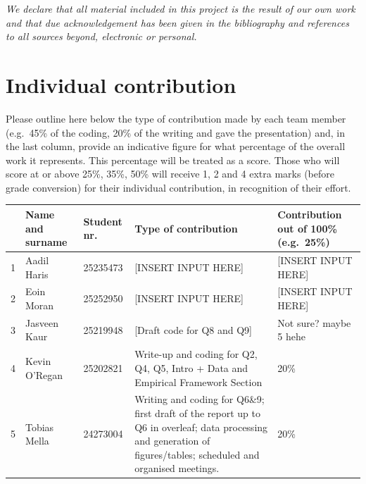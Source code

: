 \documentclass[11pt]{exam}
\begin{document}


\clearpage
\thispagestyle{plain}

\noindent
\textit{We declare that all material included in this project is the result of our own work and that due acknowledgement has been given in the bibliography and references to all sources beyond, electronic or personal.}

\vspace{1em}

\section*{Individual contribution}

\noindent
Please outline here below the type of contribution made by each team member (e.g.\ 45\% of the coding, 20\% of the writing and gave the presentation) and, in the last column, provide an indicative figure for what percentage of the overall work it represents. This percentage will be treated as a score. Those who will score at or above 25\%, 35\%, 50\% will receive 1, 2 and 4 extra marks (before grade conversion) for their individual contribution, in recognition of their effort.

\vspace{1em}

\renewcommand{\arraystretch}{1.6}

\begin{tabular}{|c|p{3.6cm}|p{2.8cm}|p{4.2cm}|p{3.2cm}|}
\hline
& \textbf{Name and surname} & \textbf{Student nr.} & \textbf{Type of contribution} & \textbf{Contribution out of 100\% (e.g.\ 25\%)} \\ \hline
1 & Aadil Haris   & 25235473 & [INSERT INPUT HERE] & [INSERT INPUT HERE] \\[1.4cm] \hline
2 & Eoin Moran    & 25252950 & [INSERT INPUT HERE] & [INSERT INPUT HERE] \\[1.4cm] \hline
3 & Jasveen Kaur  & 25219948 & [Draft code for Q8 and Q9] & Not sure? maybe 5 hehe \\[1.4cm] \hline
4 & Kevin O'Regan & 25202821 & Write-up and coding for Q2, Q4, Q5, Intro + Data and Empirical Framework Section  & 20\% \\[1.4cm] \hline
5 & Tobias Mella  & 24273004 & Writing and coding for Q6\&9; first draft of the report up to Q6 in overleaf; data processing and generation of figures/tables; scheduled and organised meetings. & 20\% \\[1.4cm] \hline
\end{tabular}
\end{document}

